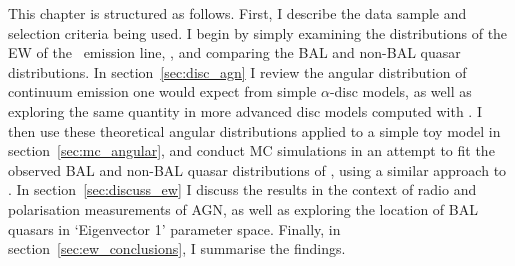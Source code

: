 This chapter is structured as follows. First, I describe
the data sample and selection criteria being used. I begin by
simply examining the distributions of the EW of the \oiiifull\ emission line,
\ewo, and comparing the BAL and non-BAL quasar distributions. 
In section~\ref{sec:disc_agn} I review the angular distribution of 
continuum emission one would expect from simple $\alpha$-disc models, 
as well as exploring the same quantity in more advanced disc models computed
with \agn. I then use these theoretical 
angular distributions applied to a simple toy model in 
section~\ref{sec:mc_angular},
and conduct MC simulations in an attempt to fit the observed BAL and non-BAL
quasar distributions of \ewo, using a similar approach to 
\citet[][hereafter R11]{risaliti2011}. 
In section~\ref{sec:discuss_ew} I discuss the results
in the context of radio and polarisation measurements of AGN, as well
as exploring the location of BAL quasars in `Eigenvector 1' parameter space.
Finally, in section~\ref{sec:ew_conclusions}, I summarise the findings.




